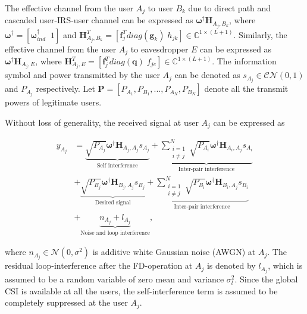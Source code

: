 \documentclass[lettersize,journal]{IEEEtran}
\begin{document}
The effective channel from the user $A_j$ to user $B_k$ due to direct path and cascaded user-IRS-user channel can be expressed as $\boldsymbol{\omega}^\dag \mathbf{H}_{A_j,B_k}$, where $\boldsymbol{\omega}^\dag = [ \boldsymbol{\omega}_{ind}^\dag \;\; 1 ]$ and $\mathbf{H}_{A_j,B_k}^T =  [\boldsymbol{f}_j^{T} diag(\boldsymbol{g}_k) \; h_{jk}] \in \mathbb{C}^{1\times (L+1)}$. Similarly, the effective channel from the user $A_j$ to eavesdropper $E$ can be expressed as $\boldsymbol{\omega}^\dag \mathbf{H}_{A_j,E}$, where $\mathbf{H}_{A_j,E}^T =  [\boldsymbol{f}_j^{T} diag(\boldsymbol{q}) \; f_{je}] \in \mathbb{C}^{1\times (L+1)}$. The information symbol and power transmitted by the user $A_j$ can be denoted as $s_{A_j} \in \mathcal{CN}(0,1)$ and $P_{A_j}$ respectively. Let $\mathbf{P} = [P_{A_1}, P_{B_1}, ..., P_{A_N}, P_{B_N}]$ denote all the transmit powers of legitimate users.

Without loss of generality, the received signal at user $A_j$ can be expressed as

\begin{equation}
\label{eqn1}
\begin{split}
 y_{A_j} & = \underbrace{\sqrt{P_{A_j}} \boldsymbol{\omega^\dag} \mathbf{H}_{A_j,A_j}s_{A_j}}_{\text{Self interference}} + \underbrace{\sum_{\substack{i=1 \\ i\neq j}}^{N} \sqrt{P_{A_i}} \boldsymbol{\omega^\dag} \mathbf{H}_{A_i,A_j}s_{A_i}}_{\text{Inter-pair interference}}  \\& +  \underbrace{\sqrt{P_{B_j}} \boldsymbol{\omega^\dag} \mathbf{H}_{B_j,A_j}s_{B_j}}_{\text{Desired signal}} + \underbrace{\sum_{\substack{i=1 \\ i\neq j}}^{N} \sqrt{P_{B_i}} \boldsymbol{\omega^\dag} \mathbf{H}_{B_i,A_j}s_{B_i}}_{\text{Inter-pair interference}}  \\& + \underbrace{n_{A_j} + l_{A_j}}_{\text{Noise and loop interference}} ,
\end{split}
\end{equation}

\IEEEpubidadjcol

\noindent where $n_{A_j} \in \mathcal{N}(0,\sigma^2)$ is additive white Gaussian noise (AWGN) at $A_j$. The residual loop-interference after the FD-operation at $A_j$ is denoted by $l_{A_j}$, which is assumed to be a random variable of zero mean and variance $\sigma_{l}^2$. Since the global CSI is available at all the users, the self-interference term is assumed to be completely suppressed at the user $A_j$.
\end{document}
